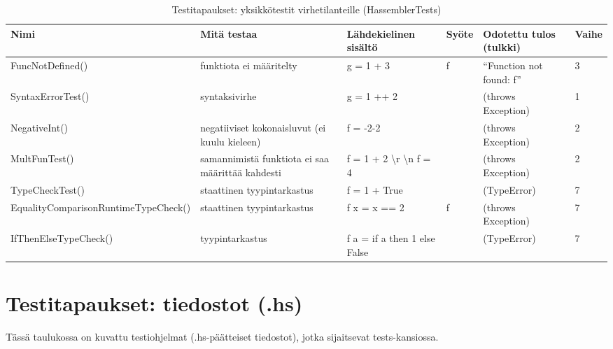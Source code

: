 \documentclass[11pt]{article} %
\begin{document}
\begin{table}[!htbp] %
\caption{Testitapaukset: yksikkötestit virhetilanteille (HassemblerTests)}
\begin{tabular}{|p{3cm}|p{}|p{3cm}|p{}|p{3cm}|p{}|}
\hline
\textbf{Nimi} & \textbf{Mitä testaa} & \textbf{Lähdekielinen sisältö} & \textbf{Syöte}  & \textbf{Odotettu tulos (tulkki)}  & \textbf{Vaihe} \\ \hline
 FuncNotDefined()  & funktiota ei määritelty   &  g = 1 + 3       &  f       &  ``Function not found: f''   &  3            \\ \hline
 SyntaxErrorTest()     & syntaksivirhe   &  g = 1 ++ 2    &           &   (throws Exception)   &    1     \\ \hline
NegativeInt()              & negatiiviset kokonaisluvut (ei kuulu kieleen)   &  f = -2-2   & &   (throws Exception)                                     &  2              \\ \hline       
MultFunTest()      & samannimistä funktiota ei saa määrittää kahdesti   & f = 1 + 2 \textbackslash r \textbackslash n f = 4   &        &  (throws Exception)    &    2                                               \\ \hline       
TypeCheckTest()             & staattinen tyypintarkastus    &  f = 1 + True      &           & (TypeError)     &   7         \\ \hline          
Equality\-Comparison\-Runtime\-TypeCheck()             &   staattinen tyypintarkastus    & f x = x == 2             & f           & (throws Exception)                      &  7          \\ \hline          
IfThenElse\-TypeCheck()             &   tyypintarkastus      &  f a = if a then 1 else False      &           &  (TypeError)                    &   7                         \\ \hline          
\end{tabular}
\end{table}

\pagebreak

\section{Testitapaukset: tiedostot (.hs)}

Tässä taulukossa on kuvattu testiohjelmat (.hs-päätteiset tiedostot), jotka sijaitsevat tests-kansiossa.
\end{document}
